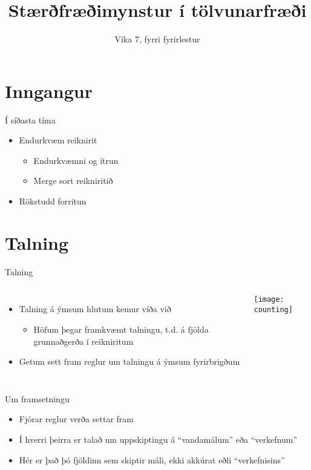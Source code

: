 \documentclass{beamer}
\title{Stærðfræðimynstur í tölvunarfræði}
\subtitle{Vika 7, fyrri fyrirlestur}
\begin{document}
\begin{frame}
\titlepage
\end{frame}


\section{Inngangur}

\begin{frame}{Í síðasta tíma}
\begin{itemize}
 \item Endurkvæm reiknirit
 \begin{itemize}
  \item Endurkvæmni og ítrun
  \item Merge sort reikniritið
 \end{itemize}
 \item Rökstudd forritun
\end{itemize}
\end{frame}

\section{Talning}

\begin{frame}{Talning}
\begin{columns}
\begin{itemize}
 \item Talning á ýmsum hlutum kemur víða við
 \begin{itemize}
  \item Höfum þegar framkvæmt talningu, t.d. á fjölda grunnaðgerða í reikniritum
 \end{itemize}
 \item Getum sett fram reglur um talningu á ýmsum fyrirbrigðum
\end{itemize}
\begin{center}
\texttt{[image: counting]}
\end{center}
\end{columns}
\end{frame}

\begin{frame}{Um framsetningu}
\begin{itemize}
 \item Fjórar reglur verða settar fram
 \item Í hverri þeirra er talað um uppskiptingu á ``vandamálum'' eða ``verkefnum''
 \item Hér er það þó fjöldinn sem skiptir máli, ekki akkúrat eðli ``verkefnisins''
\end{itemize}
\end{frame}
\end{document}
